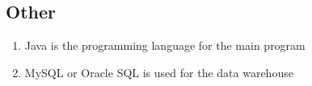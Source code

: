 \subsection{Other}
\begin{enumerate}[resume*=nonf]
  \item Java is the programming language for the main program
  \item MySQL or Oracle SQL is used for the \gls{data warehouse}
\end{enumerate}

% 
